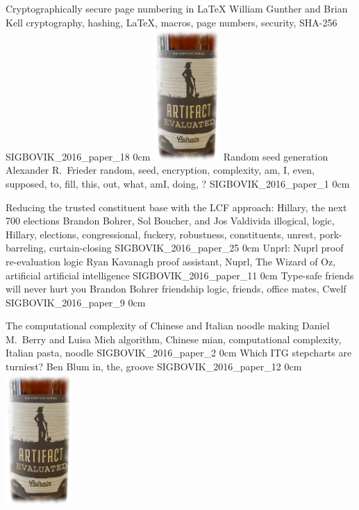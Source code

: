 
\addpaper
	{Cryptographically secure page numbering in \LaTeX}
	{William Gunther and Brian Kell}
	{cryptography, hashing, LaTeX, macros, page numbers, security, SHA-256}
	{SIGBOVIK_2016_paper_18}
	{0cm}
	{\includegraphics[width=1in]{eval}}
\addpaper
	{Random seed generation}
	{Alexander R.\ Frieder}
	{random, seed, encryption, complexity, am, I, even, supposed, to, fill, this, out, what, amI, doing, ?}
	{SIGBOVIK_2016_paper_1}
	{0cm}
	{}

\addpaper
	{Reducing the trusted constituent base with the LCF approach: Hillary, the next 700 elections}
	{Brandon Bohrer, Sol Boucher, and Jos Valdivida}
	{illogical, logic, Hillary, elections, congressional, fuckery, robustness, constituents, unrest, pork-barreling, curtain-closing}
	{SIGBOVIK_2016_paper_25}
	{0cm}
	{}
\addpaper
	{Unprl: Nuprl proof re-evaluation logic}
	{Ryan Kavanagh}
	{proof assistant, Nuprl, The Wizard of Oz, artificial artificial intelligence}
	{SIGBOVIK_2016_paper_11}
	{0cm}
	{}
\addpaper
	{Type-safe friends will never hurt you}
	{Brandon Bohrer}
	{friendship logic, friends, office mates, Cwelf}
	{SIGBOVIK_2016_paper_9}
	{0cm}
	{}

\addpaper
	{The computational complexity of Chinese and Italian noodle making}
	{Daniel M.\ Berry and Luisa Mich}
	{algorithm, Chinese mian, computational complexity, Italian pasta, noodle}
	{SIGBOVIK_2016_paper_2}
	{0cm}
	{}
\addpaper
	{Which ITG stepcharts are turniest?}
	{Ben Blum}
	{in, the, groove}
	{SIGBOVIK_2016_paper_12}
	{0cm}
	{\includegraphics[width=1in]{eval}}

